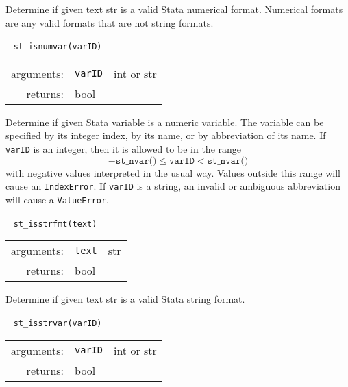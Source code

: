 \documentclass{article}
\begin{document}
			\vspace{1.5mm}
			\noindent Determine if given text str is a valid Stata numerical format. Numerical formats are any valid formats that are not string formats. \newline
			
			
			\ \newline
			\noindent \lstinline$st_isnumvar(varID)$
								
			\vspace{1.5mm}
			\noindent 
			\indent \begin{tabular}{rrl}
					arguments: & \texttt{varID} & int or str \\
					returns: & \multicolumn{2}{l}{bool}
				\end{tabular}
								
			\vspace{1.5mm}
			\noindent Determine if given Stata variable is a numeric variable. The variable can be specified by its integer index, by its name, or by abbreviation of its name. If \lstinline{varID} is an integer, then it is allowed to be in the range
			\[
				-\texttt{st\_nvar()} \leq \texttt{varID} < \texttt{st\_nvar()}
			\]
			with negative values interpreted in the usual way. Values outside this range will cause an \lstinline{IndexError}. If \lstinline{varID} is a string, an invalid or ambiguous abbreviation will cause a \lstinline{ValueError}. \newline
			
			
			\ \newline
			\noindent \lstinline$st_isstrfmt(text)$
								
			\vspace{1.5mm}
			\noindent 
			\indent \begin{tabular}{rrl}
					arguments: & \texttt{text} & str \\
					returns: & \multicolumn{2}{l}{bool}
				\end{tabular}
								
			\vspace{1.5mm}
			\noindent Determine if given text str is a valid Stata string format. \newline
			
						
			\ \newline
			\noindent \lstinline$st_isstrvar(varID)$
								
			\vspace{1.5mm}
			\noindent 
			\indent \begin{tabular}{rrl}
					arguments: & \texttt{varID} & int or str \\
					returns: & \multicolumn{2}{l}{bool}
				\end{tabular}
								
\end{document}

